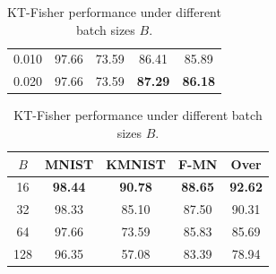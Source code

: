 \documentclass{article}
\theoremstyle{plain}
\theoremstyle{definition}
\theoremstyle{remark}
\begin{document}
\begin{table}[t]
\begin{minipage}{0.32\textwidth}
\begin{center}
\begin{small}
\begin{sc}
\begin{tabular}{ccccc}
0.010 & 97.66 & 73.59 & 86.41 & 85.89 \\
0.020 & 97.66 & 73.59 & \textbf{87.29} & \textbf{86.18} \\
\bottomrule
\end{tabular}
\end{sc}
\end{small}
\end{center}
\end{minipage}
\hfill
\begin{minipage}{0.32\textwidth}
\caption{KT-Fisher performance under different batch sizes \(B\).}
\label{tab:ablation_batch_size}
\vskip 0.15in
\begin{center}
\begin{small}
\begin{sc}
\begin{tabular}{ccccc}
\toprule
\(B\) & MNIST & KMNIST & F-MN & Over \\
\midrule
16  & \textbf{98.44} & \textbf{90.78} & \textbf{88.65} & \textbf{92.62} \\
32  & 98.33 & 85.10 & 87.50 & 90.31 \\
64  & 97.66 & 73.59 & 85.83 & 85.69 \\
128 & 96.35 & 57.08 & 83.39 & 78.94 \\
\bottomrule
\end{tabular}
\end{sc}
\end{small}
\end{center}
\end{minipage}
\end{table}
\end{document}
